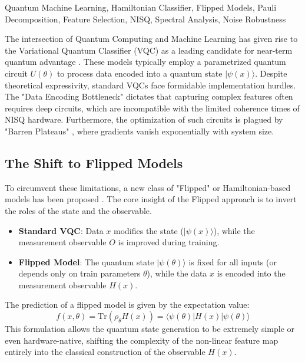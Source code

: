 \documentclass[conference]{IEEEtran}
\begin{document}
\begin{IEEEkeywords}
Quantum Machine Learning, Hamiltonian Classifier, Flipped Models, Pauli Decomposition, Feature Selection, NISQ, Spectral Analysis, Noise Robustness
\end{IEEEkeywords}

\label{sec:introduction}
The intersection of Quantum Computing and Machine Learning has given rise to the Variational Quantum Classifier (VQC) as a leading candidate for near-term quantum advantage \cite{cerezo2021variational, preskill2018quantum}. These models typically employ a parametrized quantum circuit $U(\theta)$ to process data encoded into a quantum state $|\psi(x)\rangle$. Despite theoretical expressivity, standard VQCs face formidable implementation hurdles. The "Data Encoding Bottleneck" \cite{schuld2021supervised} dictates that capturing complex features often requires deep circuits, which are incompatible with the limited coherence times of NISQ hardware. Furthermore, the optimization of such circuits is plagued by "Barren Plateaus" \cite{mcclean2018barren}, where gradients vanish exponentially with system size.

\subsection{The Shift to Flipped Models}
To circumvent these limitations, a new class of "Flipped" or Hamiltonian-based models has been proposed \cite{jerbi2024flipped}. The core insight of the Flipped approach is to invert the roles of the state and the observable. 
\begin{itemize}
    \item \textbf{Standard VQC}: Data $x$ modifies the state ($|\psi(x)\rangle$), while the measurement observable $O$ is improved during training.
    \item \textbf{Flipped Model}: The quantum state $|\psi(\theta)\rangle$ is fixed for all inputs (or depends only on train parameters $\theta$), while the data $x$ is encoded into the measurement observable $H(x)$.
\end{itemize}
The prediction of a flipped model is given by the expectation value:
\begin{equation}
    f(x, \theta) = \text{Tr}(\rho_\theta H(x)) = \langle \psi(\theta) | H(x) | \psi(\theta) \rangle
\end{equation}
This formulation allows the quantum state generation to be extremely simple or even hardware-native, shifting the complexity of the non-linear feature map entirely into the classical construction of the observable $H(x)$.
\end{document}
